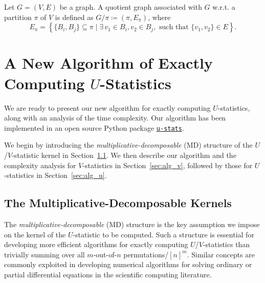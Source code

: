 \documentclass[twoside,11pt]{article}
\newcommand{\Chen}[1]{{\color{orange}{Chen: #1}}}
\newcommand{\pdfu}{\texorpdfstring{$U$}{U}}
\newcommand{\libref}[2]{\href{#2}{\texttt{#1}}}
\newcommand{\sPi}{\pi}
\def\package{\libref{u-stats}{https://github.com/zrq1706/U-Statistics-python}}
\begin{document}
\begin{definition}
\label{def:quotient_graph}
Let $G = (V, E)$ be a graph. A quotient graph associated with $G$ w.r.t. a partition $\sPi$ of $V$ is defined as $G/\pi \coloneqq (\pi, E_{\pi})$, where
\begin{equation*}
    E_\pi = \left\{\{B_i,B_j\} \subseteq \pi \mid \exists \, v_1 \in B_i, v_2 \in B_j, \text{ such that } \{v_1, v_2\} \in E\right\}. 
\end{equation*}
\end{definition}



\section{A New Algorithm of Exactly Computing \pdfu{}-Statistics}
\label{sec:alg_u_v}

We are ready to present our new algorithm for exactly computing $U$-statistics, along with an analysis of the time complexity. Our algorithm has been implemented in an open source Python package \package{}. 

We begin by introducing the \emph{multiplicative-decomposable} (MD) structure of the $U$/$V$-statistic kernel in Section~\ref{sec:decomposition}. We then describe our algorithm and the complexity analysis for $V$-statistics in Section~\ref{sec:alg_v}, followed by those for $U$-statistics in Section~\ref{sec:alg_u}.


\subsection{The Multiplicative-Decomposable Kernels}
\label{sec:decomposition}

The \emph{multiplicative-decomposable} (MD) structure is the key assumption we impose on the kernel of the $U$-statistic to be computed. Such a structure is essential for developing more efficient algorithms for exactly computing $U$/$V$-statistics than trivially summing over all $m$-out-of-$n$ permutations/$[n]^{m}$. Similar concepts are commonly exploited in developing numerical algorithms for solving ordinary or partial differential equations in the scientific computing literature.
\end{document}

